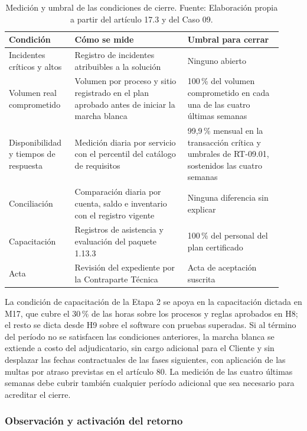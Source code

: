 \documentclass[11pt]{article}
\begin{document}
\begin{longtable}{@{}p{0.22\linewidth}p{0.38\linewidth}p{0.32\linewidth}@{}}
\caption[Medición y umbral de las condiciones de cierre]{Medición y umbral de las condiciones de cierre. Fuente: Elaboración propia a partir del artículo 17.3 y del Caso 09.}\label{tab:t18-cierre}\\
\toprule
\textbf{Condición} & \textbf{Cómo se mide} & \textbf{Umbral para cerrar} \\
\midrule
\endhead
\bottomrule
\endlastfoot
Incidentes críticos y altos & Registro de incidentes atribuibles a la solución & Ninguno abierto \\
Volumen real comprometido & Volumen por proceso y sitio registrado en el plan aprobado antes de iniciar la marcha blanca & 100\,\% del volumen comprometido en cada una de las cuatro últimas semanas \\
Disponibilidad y tiempos de respuesta & Medición diaria por servicio con el percentil del catálogo de requisitos & 99,9\,\% mensual en la transacción crítica y umbrales de RT-09.01, sostenidos las cuatro semanas \\
Conciliación & Comparación diaria por cuenta, saldo e inventario con el registro vigente & Ninguna diferencia sin explicar \\
Capacitación & Registros de asistencia y evaluación del paquete 1.13.3 & 100\,\% del personal del plan certificado \\
Acta & Revisión del expediente por la Contraparte Técnica & Acta de aceptación suscrita \\
\end{longtable}

La condición de capacitación de la Etapa 2 se apoya en la capacitación dictada en M17, que cubre el 30\,\% de las horas sobre los procesos y reglas aprobados en H8; el resto se dicta desde H9 sobre el software con pruebas superadas.
Si al término del período no se satisfacen las condiciones anteriores, la marcha blanca se extiende a costo del adjudicatario, sin cargo adicional para el Cliente y sin desplazar las fechas contractuales de las fases siguientes, con aplicación de las multas por atraso previstas en el artículo 80. La medición de las cuatro últimas semanas debe cubrir también cualquier período adicional que sea necesario para acreditar el cierre.

\subsubsection*{Observación y activación del retorno}
\end{document}
